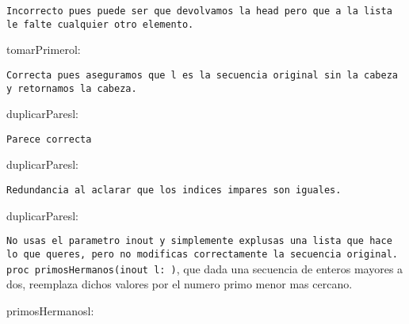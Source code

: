 \documentclass[10pt,a4paper]{article}
\begin{document}
\texttt{\color{red}Incorrecto pues puede ser que devolvamos la head pero que a la lista le falte cualquier otro elemento.}
\pagebreak
\begin{proc}{tomarPrimero}{\Inout l: \TLista{\float}}{\float}
\end{proc}
\texttt{\color{red}Correcta pues aseguramos que l es la secuencia original sin la cabeza y retornamos la cabeza.}
\begin{proc}{duplicarPares}{\Inout l: \TLista{\ent}}{}
\end{proc}
\texttt{\color{red}Parece correcta}
\begin{proc}{duplicarPares}{\Inout l: \TLista{\ent}}{}
\end{proc}
\texttt{\color{red}Redundancia al aclarar que los indices impares son iguales.}
\begin{proc}{duplicarPares}{\Inout l: \TLista{\ent}}{\TLista{\ent}}
    \requiere{\True}
\end{proc}
\texttt{\color{red}No usas el parametro inout y simplemente explusas una lista que hace lo que queres, pero no modificas correctamente la secuencia original.}
\texttt{proc primosHermanos(inout l: \TLista{\ent})}, que dada una secuencia de enteros mayores a dos, reemplaza dichos valores por el numero primo menor mas cercano.
{\color{red}\begin{proc}{primosHermanos}{\Inout l: \TLista{\ent}}{}
\end{proc}
}
\end{document}
